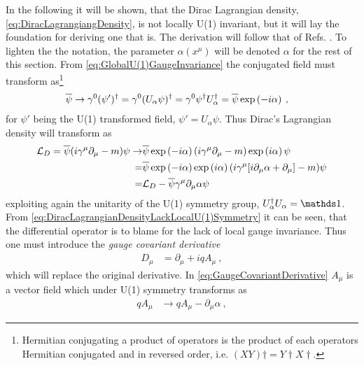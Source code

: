 \documentclass[../main.tex]{subfiles} %
\begin{document}
In the following it will be shown, that the Dirac Lagrangian density, \cref{eq:DiracLagrangiangDensity}, is not locally U(1) invariant, but it will lay the foundation for deriving one that is. The derivation will follow that of Refs. \cite{peskin_introToQFT_1995, griffiths_introToElementaryParticles_2008, panyella_masterThesis_2019}. To lighten the the notation, the parameter $\alpha(x^\mu)$ will be denoted $\alpha$ for the rest of this section. From \cref{eq:GlobalU(1)GaugeInvariance} the conjugated field must transform as\footnote{Hermitian conjugating a product of operators is the product of each operators Hermitian conjugated and in reversed order, i.e. $(XY)\dagger = Y\dagger X\dagger$.}
\begin{align}
    \psibar &\rightarrow \gamma^0 (\psi')\dagger
        = \gamma^0 (U_\alpha \psi)\dagger
        = \gamma^0\psi\dagger U_\alpha\dagger
        = \psibar\exp{-i\alpha} \: ,
\end{align}
for $\psi'$ being the U(1) transformed field, $\psi' = U_\alpha \psi$. Thus Dirac's Lagrangian density will transform as
\begin{align} \label{eq:DiracLagrangianDensityLackLocalU(1)Symmetry}
\begin{split}
    \L_D = \psibar (i \gamma^\mu \partial_\mu - m) \psi \rightarrow
        & \psibar \exp{-i\alpha} (i \gamma^\mu \partial_\mu - m) \exp{i\alpha} \psi \\
        =& \psibar \exp{-i\alpha} \exp{i\alpha} (i \gamma^\mu [i \partial_\mu \alpha + \partial_\mu] - m) \psi \\
        =& \L_D - \psibar\gamma^\mu \partial_\mu \alpha \psi
\end{split}
\end{align}
exploiting again the unitarity of the U(1) symmetry group, $U_\alpha\dagger U_\alpha = \id$. From \cref{eq:DiracLagrangianDensityLackLocalU(1)Symmetry} it can be seen, that the differential operator is to blame for the lack of local gauge invariance. Thus one must introduce the \emph{gauge covariant derivative}
\begin{align} \label{eq:GaugeCovariantDerivative}
    D_\mu &= \partial_\mu + iqA_\mu \: ,
\end{align}
which will replace the original derivative. In \cref{eq:GaugeCovariantDerivative} $A_\mu$ is a vector field which under U(1) symmetry transforms as
\begin{align}
    qA_\mu &\rightarrow qA_\mu - \partial_\mu\alpha \: ,
\end{align}
\end{document}
